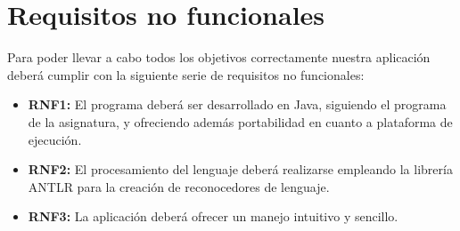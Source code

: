 \documentclass[11pt,a4paper]{report}
\begin{document}
\section{Requisitos no funcionales}
\label{sec-1.3}


Para poder llevar a cabo todos los objetivos correctamente nuestra aplicación deberá cumplir con la siguiente serie de requisitos no funcionales: \\


\begin{itemize}
\item \textbf{RNF1:} El programa deberá ser desarrollado en Java, siguiendo el programa de la asignatura, y ofreciendo además portabilidad en cuanto a plataforma de ejecución.
\item \textbf{RNF2:} El procesamiento del lenguaje deberá realizarse empleando la librería ANTLR para la creación de reconocedores de lenguaje.
\item \textbf{RNF3:} La aplicación deberá ofrecer un manejo intuitivo y sencillo.
\end{itemize}
\end{document}
